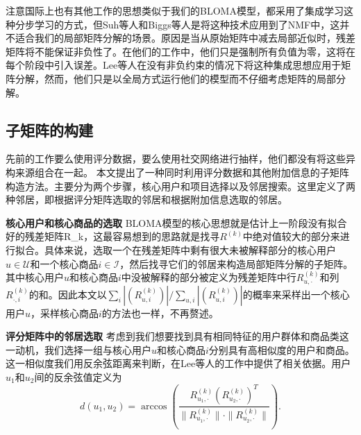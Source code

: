 注意国际上也有其他工作的思想类似于我们的BLOMA模型，都采用了集成学习这种分步学习的方式，但Suh等人和Biggs等人是将这种技术应用到了NMF中，这并不适合我们的局部矩阵分解的场景。原因是当从原始矩阵中减去局部近似时，残差矩阵将不能保证非负性了。在他们的工作中，他们只是强制所有负值为零，这将在每个阶段中引入误差。Lee等人在没有非负约束的情况下将这种集成思想应用于矩阵分解，然而，他们只是以全局方式运行他们的模型而不仔细考虑矩阵的局部分解。

\subsection{子矩阵的构建}
先前的工作要么使用评分数据，要么使用社交网络进行抽样，他们都没有将这些异构来源组合在一起。 本文提出了一种同时利用评分数据和其他附加信息的子矩阵构造方法。主要分为两个步骤，核心用户和项目选择以及邻居搜索。这里定义了两种邻居，即根据评分矩阵选取的邻居和根据附加信息选取的邻居。

\vspace{3mm}
\noindent\textbf{核心用户和核心商品的选取}
BLOMA模型的核心思想就是估计上一阶段没有拟合好的残差矩阵\gls{R_k}，这最容易想到的思路就是找寻$R^{(k)}$中绝对值较大的部分来进行拟合。具体来说，选取一个在残差矩阵中剩有很大未被解释部分的核心用户$u \in \mathcal{U}$和一个核心商品$i \in \mathcal{I}$，然后找寻它们的邻居来构造局部矩阵分解的子矩阵。其中核心用户$u$和核心商品$i$中没被解释的部分被定义为残差矩阵中行$R_{u,\cdot}^{(k)}$和列$R_{\cdot,i}^{(k)}$的和。因此本文以$\sum_i|(R_{u,i}^{(k)})|/\sum_{u,i}|(R_{u,i}^{(k)})|$的概率来采样出一个核心用户$u$，采样核心商品$i$的方法也一样，不再赘述。

\vspace{3mm}
\noindent\textbf{评分矩阵中的邻居选取}
考虑到我们想要找到具有相同特征的用户群体和商品类这一动机，我们选择一组与核心用户$ u $和核心商品$ i $分别具有高相似度的用户和商品。这一相似度我们用反余弦距离来判断，在Lee等人的工作中提供了相关依据。用户$ u_1 $和$ u_2 $间的反余弦值定义为
\begin{equation}
\label{arc-cosine}
d(u_1,u_2) = \arccos(\frac{R_{u_1,\cdot}^{(k)} (R^{(k)}_{u_2,\cdot})^T}{\|R^{(k)}_{u_1,\cdot}\|\cdot\|R^{(k)}_{u_2,\cdot}\|}).
\end{equation}


